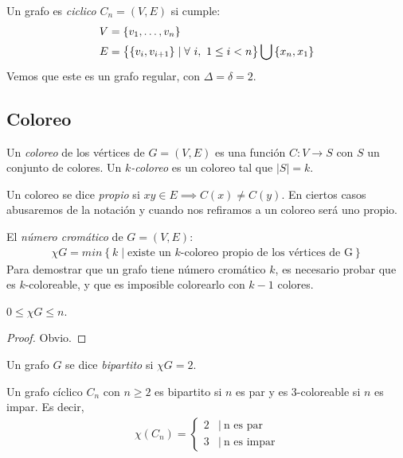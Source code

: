 \begin{definition}
Un grafo es \emph{ciclico} $C_n = (V,E)$ si cumple:
\begin{align}
    V &= \left\{v_1,\mathellipsis,v_n\right\}\\
    E &= \left\{ \left\{v_i,v_{i+1}\right\} \mid \forall~i,~ 1 \le i < n\right\} \bigcup \left\{x_n,x_1\right\}\\
\end{align}
Vemos que este es un grafo regular, con $\Delta = \delta = 2$.
\end{definition}

\subsection{Coloreo}
\begin{definition}
Un \emph{coloreo} de los vértices de $G = (V,E)$ es una función $C \colon V \to S$ con $S$ un conjunto de colores. Un \emph{$k$-coloreo} es un coloreo tal que $|S| = k$.
\end{definition}

\begin{definition}
Un coloreo se dice \emph{propio} si $xy \in E \implies C(x) \neq C(y)$. En ciertos casos abusaremos de la notación y cuando nos refiramos a un coloreo será uno propio.
\end{definition}

\begin{definition}
El \emph{número cromático} de $G = (V,E)$:
\begin{align}
    \chi{G} = min\left\{k \mid \text{existe un $k$-coloreo propio de los vértices de G}\right\}
\end{align}
Para demostrar que un grafo tiene número cromático $k$, es necesario probar que es $k$-coloreable, y que es imposible colorearlo con $k-1$ colores.
\end{definition}

\begin{proposition}
$0 \le \chi{G}\le n$.
\end{proposition}
\begin{proof}
Obvio.
\end{proof}

\begin{definition}
Un grafo $G$ se dice \emph{bipartito} si $\chi{G} = 2$.
\end{definition}

\begin{proposition}\label{graph_cyclic_color}
Un grafo cíclico $C_n$ con $n \ge 2$ es bipartito si $n$ es par y es $3$-coloreable si $n$ es impar. Es decir,
\begin{align}
    \chi(C_n) = 
    \begin{cases}
                2 & |\ \text{n es par} \\
                3 & |\ \text{n es impar}
    \end{cases}
\end{align}
\end{proposition}

